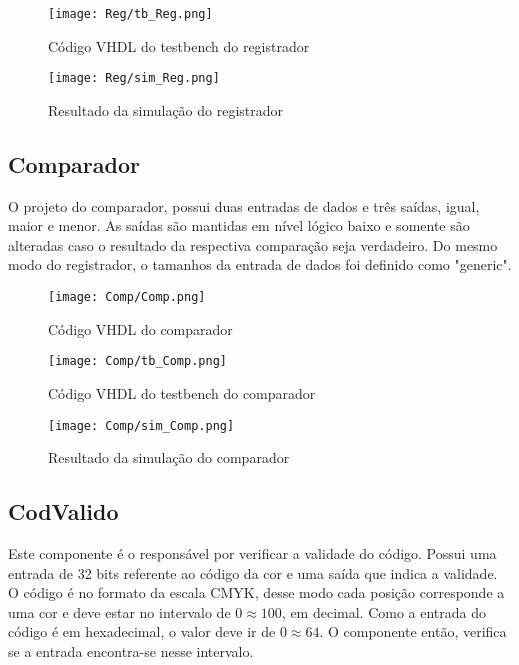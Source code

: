 \documentclass[12pt,a4paper,oneside]{abntex2}
\begin{document}
                \begin{figure}[h!]
                    \centering
                    \texttt{[image: Reg/tb\_Reg.png]}
                    \caption{Código VHDL do testbench do registrador}
                    \label{fig:tb_Reg}
                \end{figure}

                \begin{figure}[h!]
                    \centering
                    \texttt{[image: Reg/sim\_Reg.png]}
                    \caption{Resultado da simulação do registrador}
                    \label{fig:sim_Reg}
                \end{figure}
                
            \subsection{Comparador}
                O projeto do comparador, possui duas entradas de dados e três saídas, igual, maior e menor. As saídas são mantidas em nível lógico baixo e somente são alteradas caso o resultado da respectiva comparação seja verdadeiro. Do mesmo modo do registrador, o tamanhos da entrada de dados foi definido como "generic".

                \begin{figure}[h!]
                    \centering
                    \texttt{[image: Comp/Comp.png]}
                    \caption{Código VHDL do comparador}
                    \label{fig:Comp}
                \end{figure}

                \begin{figure}[h!]
                    \centering
                    \texttt{[image: Comp/tb\_Comp.png]}
                    \caption{Código VHDL do testbench do comparador}
                    \label{fig:tb_Comp}
                \end{figure}

                \begin{figure}[h!]
                    \centering
                    \texttt{[image: Comp/sim\_Comp.png]}
                    \caption{Resultado da simulação do comparador}
                    \label{fig:sim_Comp}
                \end{figure}
            \subsection{CodValido}
                Este componente é o responsável por verificar a validade do código. Possui uma entrada de 32 bits referente ao código da cor e uma saída que indica a validade. O código é no formato da escala CMYK, desse modo cada posição corresponde a uma cor e deve estar no intervalo de $0\approx100$, em decimal. Como a entrada do código é em hexadecimal, o valor deve ir de $0\approx64$. O componente então, verifica se a entrada encontra-se nesse intervalo.
\end{document}
